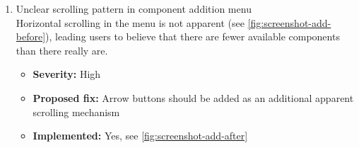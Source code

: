 \begin{enumerate}[label=\textbf{I\arabic*:}, leftmargin=*]
    \item Unclear scrolling pattern in component addition menu
        \vspace{2pt}
        \\Horizontal scrolling in the menu is not apparent (see \autoref{fig:screenshot-add-before}), leading users to believe that there are fewer available components than there really are.
        \begin{itemize}[noitemsep, label=\trianglebullet]
            \item \textbf{Severity:} High
            \item \textbf{Proposed fix:} Arrow buttons should be added as an additional apparent scrolling mechanism
            \item \textbf{Implemented:} Yes, see \autoref{fig:screenshot-add-after}
        \end{itemize}
        \vspace{2em}


\end{enumerate}
